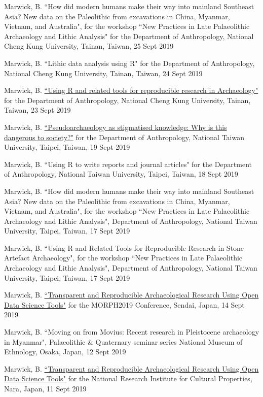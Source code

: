 \ind Marwick, B.  ``How did modern humans make their way into mainland Southeast Asia? New data on the Paleolithic from excavations in China, Myanmar, Vietnam, and Australia", for the workshop ``New Practices in Late Palaeolithic Archaeology and Lithic Analysis" for the Department of Anthropology, National Cheng Kung University, Tainan, Taiwan, 25 Sept 2019 

\ind Marwick, B. ``Lithic data analysis using R" for the Department of Anthropology, National Cheng Kung University, Tainan, Taiwan, 24 Sept 2019 

\ind Marwick, B. \href{https://osf.io/e3x7u/}{``Using R and related tools for reproducible research in Archaeology"} for the Department of Anthropology, National Cheng Kung University, Tainan, Taiwan, 23 Sept 2019 

\ind Marwick, B. \href{https://osf.io/ktrns/}{``Pseudoarchaeology as stigmatised knowledge: Why is this dangerous to society?"} for the Department of Anthropology, National Taiwan University, Taipei, Taiwan, 19 Sept 2019 

\ind Marwick, B. ``Using R to write reports and journal articles" for the Department of Anthropology, National Taiwan University, Taipei, Taiwan, 18 Sept 2019

\ind Marwick, B. ``How did modern humans make their way into mainland Southeast Asia? New data on the Paleolithic from excavations in China, Myanmar, Vietnam, and Australia", for the workshop ``New Practices in Late Palaeolithic Archaeology and Lithic Analysis", Department of Anthropology, National Taiwan University, Taipei, Taiwan, 17 Sept 2019

\ind Marwick, B. ``Using R and Related Tools for Reproducible Research in Stone Artefact Archaeology", for the workshop ``New Practices in Late Palaeolithic Archaeology and Lithic Analysis", Department of Anthropology, National Taiwan University, Taipei, Taiwan, 17 Sept 2019

\ind Marwick, B. \href{https://benmarwick.github.io/2019-09-14-morph2019/}{``Transparent and Reproducible Archaeological Research Using Open Data Science Tools"} for the MORPH2019 Conference, Sendai, Japan, 14 Sept 2019 

\ind Marwick, B.  ``Moving on from Movius: Recent research in Pleistocene archaeology in Myanmar", Palaeolithic \& Quaternary seminar series National Museum of Ethnology, Osaka, Japan, 12 Sept 2019

\ind Marwick, B. \href{https://benmarwick.github.io/2019-09-10-nara/}{``Transparent and Reproducible Archaeological Research Using Open Data Science Tools"} for the National Research Institute for Cultural Properties, Nara, Japan, 11 Sept 2019 

